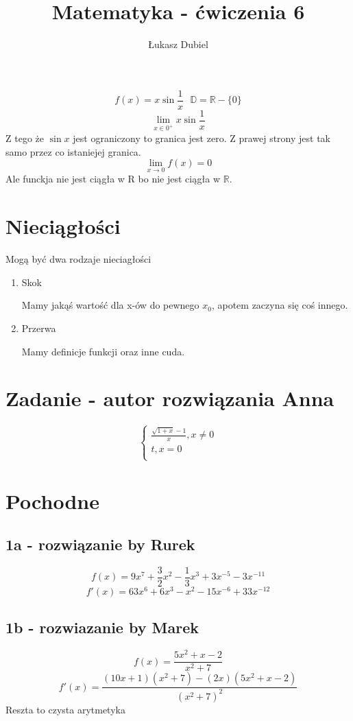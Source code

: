 \documentclass{article}
\author{Łukasz Dubiel}
\title{Matematyka - ćwiczenia 6}
\begin{document}
\maketitle

$$f(x) = x \sin{\frac{1}{x}}\ \ \  \mathbb{D} = \mathbb{R} - \{0\} $$
$$\lim_{x \in 0^+}{x \sin{\frac{1}{x}}} $$
Z tego że $\sin{x}$ jest ograniczony to granica jest zero.
Z prawej strony jest tak samo przez co istaniejej granica.
$$\lim_{ x \to 0}{f(x)} = 0 $$
Ale funckja nie jest ciągła w R bo nie jest ciągła w $\mathbb{R}$.

\bigskip

\section{Nieciągłości}
Mogą być dwa rodzaje nieciagłości
\begin{enumerate}
\item{Skok}

Mamy jakąś wartość dla x-ów do pewnego $x_0$, apotem zaczyna się coś innego.

\item{Przerwa}

Mamy definicje funkcji oraz inne cuda.


\end{enumerate}

\section{Zadanie - autor rozwiązania Anna}
$$
\begin{cases}
\frac{\sqrt{1 +x} - 1}{x} , x \not= 0 \\
t , x = 0\\
\end{cases}
$$

\section{Pochodne}
\subsection{1a - rozwiązanie by Rurek}
$$f(x) = 9x^7+ \frac{3}{2}x^2 - \frac{1}{3}x^3 + 3x^{-5} - 3 x^{-11} $$
$$f'(x) = 63x^6 + 6x^3 - x^2 - 15x^{-6} + 33x^{-12}$$
\subsection{1b - rozwiazanie by Marek}
$$f(x) = \frac{5x^2 + x - 2}{x^2+7} $$
$$f'(x) = \frac{(10x +1)(x^2 + 7) - (2x)(5x^2 + x -2)}{(x^2 + 7)^2} $$
Reszta to czysta arytmetyka
\end{document}
